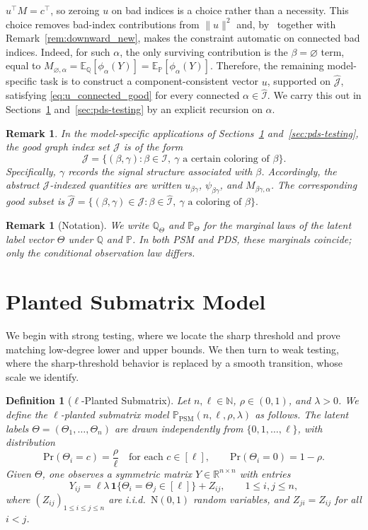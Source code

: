 \documentclass[11pt, letterpaper]{article}
\newtheorem{definition}[theorem]{Definition}
\newtheorem{remark}[theorem]{Remark}
\numberwithin{equation}{section}
\newcommand{\cJ}{\mathcal{J}}
\newcommand{\cI}{\mathcal{I}}
\newcommand{\E}{\mathbb{E}}
\newcommand{\PP}{\mathbb{P}}
\newcommand{\QQ}{\mathbb{Q}}
\newcommand{\goodI}{\widehat{\mathcal{I}}}
\newcommand{\goodJ}{\widehat{\mathcal{J}}}
\begin{document}
$u^\top M=c^\top$, so zeroing $u$ on bad indices is a choice rather than a necessity. This choice removes bad-index contributions from $\|u\|^2$ and, by~ together with
Remark~\ref{rem:downward_new}, makes the constraint automatic on connected bad indices. Indeed, for such $\alpha$, the only surviving contribution is the $\beta=\varnothing$ term, equal to
$M_{\varnothing,\alpha}=\E_\QQ[\phi_\alpha(Y)]=\E_\PP[\phi_\alpha(Y)]$. Therefore, the remaining
model-specific task is to construct a component-consistent vector $u$, supported
on $\goodJ$, satisfying \eqref{eq:u_connected_good} for every connected
$\alpha\in\goodI$. We carry this out in Sections~\ref{sec:psm-testing} and~\ref{sec:pds-testing} by an explicit recursion on $\alpha$.

\begin{remark}\label{rem:indexing-hatJ}
In the model-specific applications of Sections~\ref{sec:psm-testing} and~\ref{sec:pds-testing}, the good graph index set $\cJ$ is of the form
\[
\cJ=\{(\beta,\gamma):\beta\in\cI,\ \gamma \text{ a certain coloring of } \beta\}.
\]
Specifically, $\gamma$ records the signal structure associated with $\beta$.
Accordingly, the abstract $\cJ$-indexed quantities are written
$u_{\beta\gamma}$, $\psi_{\beta\gamma}$, and $M_{\beta\gamma,\alpha}$.
The corresponding good subset is
$
\goodJ=\{(\beta,\gamma)\in\cJ:\beta\in\goodI, \ \gamma \text{ a coloring of } \beta\}.
$
\end{remark}

\begin{remark}[Notation]
We write $\QQ_\Theta$ and $\PP_\Theta$ for the marginal laws of the latent label vector $\Theta$ under $\QQ$ and $\PP$. In both PSM and PDS, these marginals coincide; only the conditional observation law differs.
\end{remark}


\section{Planted Submatrix Model}\label{sec:psm-testing} We begin with strong testing, where we locate the sharp threshold and prove matching low-degree lower and upper bounds. We then turn to weak testing, where the sharp-threshold behavior is replaced by a smooth transition, whose scale we identify.
\begin{definition}[$\ell$-Planted Submatrix]\label{def:PSM}
Let $n,\ell \in \mathbb{N}$, $\rho \in (0,1)$,
and $\lambda > 0$. We define the $\ell$-planted submatrix model $\mathbb{P}_{\mathrm{PSM}}(n,\ell,\rho,\lambda)$ as follows.
The latent labels $\Theta = (\Theta_1,\dots,\Theta_n)$ are drawn independently from $\{0,1,\dots,\ell\}$, with distribution
\[
\mathrm{Pr}(\Theta_i = c) = \frac{\rho}{\ell}
\quad \text{for each } c \in [\ell],
\qquad
\mathrm{Pr}(\Theta_i = 0) = 1-\rho.
\]
Given $\Theta$, one observes a symmetric matrix $Y \in \mathbb{R}^{n\times n}$ with entries
\[
Y_{ij}
=
\ell\lambda\,\mathbf{1} \{\Theta_i=\Theta_j\in[\ell]\}+Z_{ij},
\qquad 1 \le i,j \le n,
\]
where $(Z_{ij})_{1 \le i \le j \le n}$ are i.i.d.\ $\mathrm{N}(0,1)$ random variables, and $Z_{ji}=Z_{ij}$ for all $i<j$.
\end{definition}
\end{document}
